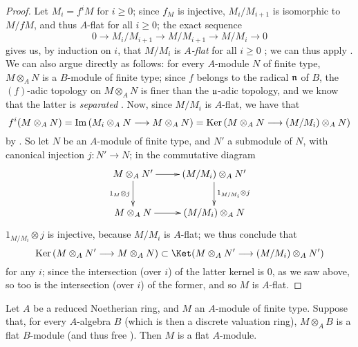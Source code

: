 \begin{proof}
\label{proof-0.10.2.7}
Let $M_i=f^iM$ for $i\geq0$;
since $f_M$ is injective, $M_i/M_{i+1}$ is isomorphic to $M/fM$, and thus $A$-flat for all $i\geq0$;
the exact sequence
\[
    0 \to M_i/M_{i+1} \to M/M_{i+1} \to M/M_i \to 0
\]
gives us, by induction on $i$, that $M/M_i$ is \emph{$A$-flat} for all $i\geq0$ ;
we can thus apply .
We can also argue directly as follows:
for every $A$-module $N$ of finite type, $M\otimes_A N$ is a $B$-module of finite type;
since $f$ belongs to the radical $\mathfrak{n}$ of $B$, the $(f)$-adic topology on $M\otimes_A N$ is finer than the
$\mathfrak{u}$-adic topology, and we know that the latter is \emph{separated} \sref[0\textsubscript{I},0.7.3.5].
Now, since $M/M_i$ is $A$-flat, we have that
\[
    f^i(M\otimes_A N) = \Im(M_i\otimes_A N \to  M\otimes_A N) = \Ker(M\otimes_A N \to (M/M_i)\otimes_A N)
\]
by .
So let $N$ be an $A$-module of finite type, and $N'$ a submodule of $N$, with canonical injection $j:N'\to N$;
in the commutative diagram
\[
  \xymatrix{
    M\otimes_A N' \ar[r] \ar[d]_{1_M\otimes j}
    & (M/M_i)\otimes_A N' \ar[d]^{1_{M/M_i}\otimes j}\\
    M\otimes_A N \ar[r]
    & (M/M_i)\otimes_A N
  }
\]
$1_{M/M_i}\otimes j$ is injective, because $M/M_i$ is $A$-flat;
we thus conclude that
\[
    \Ker(M\otimes_A N' \to M\otimes_A N) \subset \Ket(M\otimes_A N' \to (M/M_i)\otimes_A N')
\]
for any $i$;
since the intersection (over $i$) of the latter kernel is $0$, as we saw above, so too is the intersection (over $i$) of the former, and so $M$ is $A$-flat.
\end{proof}

\begin{prop}[10.2.8]
\label{0.10.2.8}
Let $A$ be a reduced Noetherian ring, and $M$ an $A$-module of finite type.
Suppose that, for every $A$-algebra $B$ (which is then a discrete valuation ring), $M\otimes_A B$ is a flat $B$-module (and thus free ).
Then $M$ is a flat $A$-module.
\end{prop}

